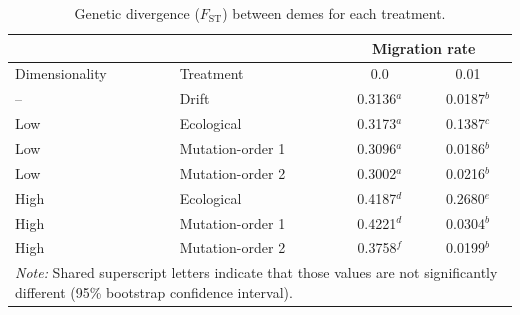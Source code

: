 \begin{doublespace}
\begin{table}
\centering
\caption{Genetic divergence ($F_{\mathrm{ST}}$)
  between demes for each treatment.}
\begin{tabular}{llcc}
\cline{3-4}
  & & \multicolumn{2}{c}{Migration rate} \\
\hline
Dimensionality & Treatment & 0.0 & 0.01 \\
\hline
--  & Drift            & 0.3136$^{a}$ & 0.0187$^{b}$ \\
\hline
Low & Ecological       & 0.3173$^{a}$ & 0.1387$^{c}$ \\
Low & Mutation-order 1 & 0.3096$^{a}$ & 0.0186$^{b}$ \\
Low & Mutation-order 2 & 0.3002$^{a}$ & 0.0216$^{b}$ \\
\hline
High & Ecological       & 0.4187$^{d}$ & 0.2680$^{e}$ \\
High & Mutation-order 1 & 0.4221$^{d}$ & 0.0304$^{b}$ \\
High & Mutation-order 2 & 0.3758$^{f}$ & 0.0199$^{b}$ \\
\hline
\multicolumn{4}{p{4in}}{\small\emph{Note:} Shared superscript letters indicate
  that those values are not significantly different
  (95\% bootstrap confidence interval).}
\end{tabular}
\label{tbl_fst}
\end{table}




\end{doublespace}
